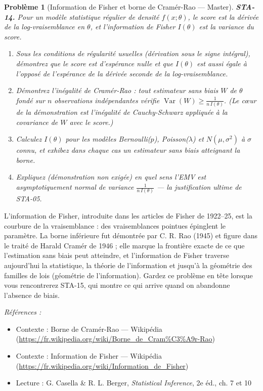 \documentclass[11pt]{article}
\newtheorem{problem}{Problème}
\newenvironment{refs}{\par\small\noindent\emph{Références :}\begin{itemize}\setlength\itemsep{0pt}}{\end{itemize}\normalsize}
\begin{document}
\bigskip

\begin{problem}[{Information de Fisher et borne de Cramér-Rao --- Master}]
\textbf{STA-14.} Pour un modèle statistique régulier de densité $ f(x; \theta) $, le score est
la dérivée de la log-vraisemblance en $ \theta $, et l'information de Fisher $ I(\theta) $ est
la variance du score.
\begin{enumerate}
\item[(a)] Sous les conditions de régularité usuelles (dérivation sous le signe intégral), démontrez que
le score est d'espérance nulle et que $ I(\theta) $ est aussi égale à l'opposé de l'espérance de
la dérivée seconde de la log-vraisemblance.
\item[(b)] Démontrez l'inégalité de Cramér-Rao : tout estimateur sans biais $ W $ de $ \theta $ fondé
sur $ n $ observations indépendantes vérifie
$ \operatorname{Var}(W) \ge \frac{1}{n\, I(\theta)} $. (Le c\oe{}ur de la démonstration est
l'inégalité de Cauchy-Schwarz appliquée à la covariance de $ W $ avec le score.)
\item[(c)] Calculez $ I(\theta) $ pour les modèles Bernoulli($ p $), Poisson($ \lambda $) et
$ N(\mu, \sigma^2) $ à $ \sigma $ connu, et exhibez dans chaque cas un estimateur sans biais
atteignant la borne.
\item[(d)] Expliquez (démonstration non exigée) en quel sens l'EMV est asymptotiquement normal de variance
$ \frac{1}{n\, I(\theta)} $ --- la justification ultime de STA-05.
\end{enumerate}

\end{problem}

\noindent L'information de Fisher, introduite dans les articles de Fisher de 1922--25, est
la courbure de la vraisemblance : des vraisemblances pointues épinglent le paramètre. La borne
inférieure fut démontrée par C. R. Rao (1945) et figure dans le traité de Harald Cramér de 1946 ;
elle marque la frontière exacte de ce que l'estimation sans biais peut atteindre, et l'information
de Fisher traverse aujourd'hui la statistique, la théorie de l'information et jusqu'à la géométrie
des familles de lois (géométrie de l'information). Gardez ce problème en tête lorsque vous
rencontrerez STA-15, qui montre ce qui arrive quand on abandonne l'absence de biais.

\begin{refs}
\item Contexte : Borne de Cramér-Rao --- Wikipédia (\url{https://fr.wikipedia.org/wiki/Borne_de_Cram%C3%A9r-Rao})
\item Contexte : Information de Fisher --- Wikipédia (\url{https://fr.wikipedia.org/wiki/Information_de_Fisher})
\item Lecture : G. Casella \& R. L. Berger, \textit{Statistical Inference}, 2e éd., ch. 7 et 10
\end{refs}
\end{document}
